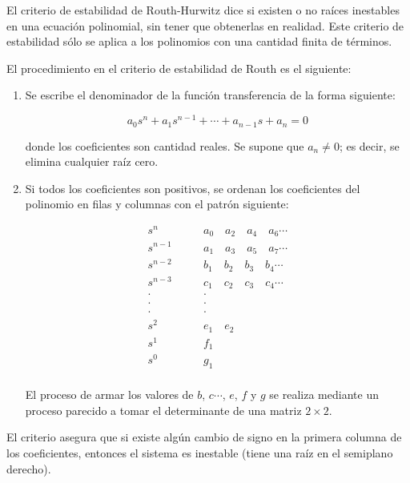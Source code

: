 \begin{tcolorbox}[colframe = white!40!black, colback = black!10!white, sharp corners, breakable, title = Criterio de estabilidad de Routh-Hurwitz]

El criterio de estabilidad de Routh-Hurwitz dice si existen o no raíces inestables en una ecuación polinomial, sin tener que obtenerlas en realidad. Este criterio de estabilidad sólo se aplica a los polinomios con una cantidad finita de términos. 

El procedimiento en el criterio de estabilidad de Routh es el siguiente:

\begin{enumerate}
    \item Se escribe el denominador de la función transferencia de la forma siguiente:
    
    \begin{equation}
        a_0s^n + a_1s^{n-1} + \cdots + a_{n-1}s + a_n = 0
    \end{equation}

    \noindent donde los coeficientes son cantidad reales. Se supone que $a_n \neq 0$; es decir, se elimina cualquier raíz cero.

    \item Si todos los coeficientes son positivos, se ordenan los coeficientes del polinomio en filas y columnas con el patrón siguiente:
    
    \begin{align*}
        s^n  &\qquad a_0 \quad a_2 \quad a_4 \quad a_6 \cdots \\
        s^{n-1}  &\qquad a_1 \quad a_3 \quad a_5 \quad a_7 \cdots \\
        s^{n-2}  &\qquad b_1 \quad b_2 \quad b_3 \quad b_4 \cdots \\
        s^{n-3}  &\qquad c_1 \quad c_2 \quad c_3 \quad c_4 \cdots \\
        \cdot &\qquad \cdot\\
        \cdot &\qquad \cdot\\
        \cdot &\qquad \cdot\\
        s^2  &\qquad e_1 \quad e_2 \\
        s^1  &\qquad f_1\\
        s^0  &\qquad g_1\\
    \end{align*}

    \noindent El proceso de armar los valores de $b$, $c \cdots$, $e$, $f$ y $g$ se realiza mediante un proceso parecido a tomar el determinante de una matriz $2\times2$. 
\end{enumerate}


El criterio asegura que si existe algún cambio de signo en la primera columna de los coeficientes, entonces el sistema es inestable (tiene una raíz en el semiplano derecho).

\end{tcolorbox}


